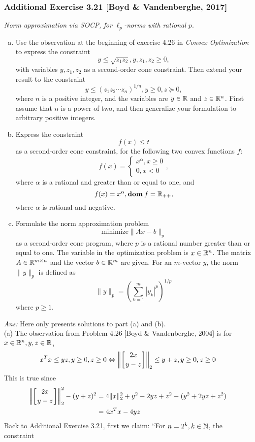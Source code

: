\documentclass[12pt,a4paper]{article}
\renewcommand{\l}{\left}\renewcommand{\r}{\right}
\newcommand{\casebrak}[2]{\left \{ \begin{array}{l} {#1}\\{#2} \end{array} \right.}
\newcommand{\SUM}[2]{\sum\limits_{#1}^{#2}}
\newcommand\dom{\mathbf{dom\:}}
\def\R{\ifmmode\mathbb R\fi}
\def\N{\ifmmode\mathbb N\fi}
\begin{document}
\subsubsection*{Additional Exercise 3.21 [Boyd \& Vandenberghe, 2017]}
{\it Norm approximation via SOCP, for $\ell_p$-norms with rational $p$.} \begin{enumerate}[(a)]
\item Use the observation at the beginning of exercise 4.26 in {\it Convex Optimization} to express the constraint
$$y\leq \sqrt{z_1z_2}, y, z_1,z_2\geq 0,$$
with variables $y, z_1,z_2$ as a second-order cone constraint. Then extend your result to the constraint 
$$y\leq (z_1z_2\cdots z_n)^{1/n}, y\geq 0, z\succeq0,$$
where $n$ is a positive integer, and the variables are $y\in\R$ and $z\in\R^n$. First assume that $n$ is a power of two, and then generalize your formulation to arbitrary positive integers. 
\item Express the constraint
$$f(x)\leq t$$
as a second-order cone constraint, for the following two convex functions $f$:
$$f(x) = \casebrak{x^\alpha, x\geq 0}{0, x<0},$$
where $\alpha$ is a rational and greater than or equal to one, and 
$$f(x) = x^\alpha, \dom f = \R_{++},$$
where $\alpha$ is rational and negative.
\item Formulate the norm approximation problem
$$\mbox{minimize} \|Ax-b\|_p$$
as a second-order cone program, where $p$ is a rational number greater than or equal to one. The variable in the optimization problem is $x\in\R^n$. The matrix $A\in\R^{m\times n}$ and the vector $b\in\R^m$ are given. For an $m$-vector $y$, the norm $\|y\|_p$ is defined as 
$$\|y\|_p = \l(\SUM{k=1}m |y_k|^p\r)^{1/p}$$
where $p\geq 1$.
\end{enumerate}
{\it Ans:} Here only presents solutions to part (a) and (b). \\
(a) The observation from Problem 4.26 [Boyd \& Vandenberghe, 2004] is for $x \in \R^n, y, z\in\R$,
$$x^Tx\leq yz, y\geq 0, z \geq 0 \Leftrightarrow \l\|\l[{2x \atop y-z}\r]\r\|_2 \leq y+z, y\geq 0, z\geq 0$$
This is true since 
\begin{align*}
\l\|\l[{2x \atop y-z}\r]\r\|_2^2 - (y+z)^2 & = 4\|x\|_2^2 + y^2 - 2yz + z^2 - (y^2+2yz+z^2)\\
&= 4x^Tx - 4yz
\end{align*}
Back to Additional Exercise 3.21, first we claim: ``For $n=2^k, k\in\N$, the constraint 
\end{document}
